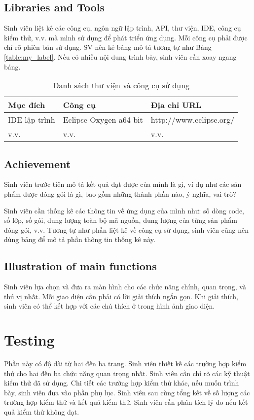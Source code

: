 \documentclass[../Main.tex]{subfiles}
\begin{document}
\subsection{Libraries and Tools}
Sinh viên liệt kê các công cụ, ngôn ngữ lập trình, API, thư viện, IDE, công cụ kiểm thử, v.v. mà mình sử dụng để phát triển ứng dụng. Mỗi công cụ phải được chỉ rõ phiên bản sử dụng. SV nên kẻ bảng mô tả tương tự như Bảng \ref{table:my_label}. Nếu có nhiều nội dung trình bày, sinh viên cần xoay ngang bảng.

\begin{table}[H]
\centering{}
    \begin{tabular}{lll}
        \hline
        \textbf{Mục đích} & \textbf{Công cụ}       & \textbf{Địa chỉ URL}    \\ \hline
        IDE lập trình     & Eclipse Oxygen a64 bit & http://www.eclipse.org/ \\ \hline
        v.v.              & v.v.                   & v.v.                    \\ \hline
        \end{tabular}
    \caption{Danh sách thư viện và công cụ sử dụng}
    \label{fig:my_label}
\end{table}

\subsection{Achievement}
Sinh viên trước tiên mô tả kết quả đạt được của mình là gì, ví dụ như các sản phẩm được đóng gói là gì, bao gồm những thành phần nào, ý nghĩa, vai trò?

Sinh viên cần thống kê các thông tin về ứng dụng của mình như: số dòng code, số lớp, số gói, dung lượng toàn bộ mã nguồn, dung lượng của từng sản phẩm đóng gói, v.v. Tương tự như phần liệt kê về công cụ sử dụng, sinh viên cũng nên dùng bảng để mô tả phần thông tin thống kê này.

\subsection{Illustration of main functions}
Sinh viên lựa chọn và đưa ra màn hình cho các chức năng chính, quan trọng, và thú vị nhất. Mỗi giao diện cần phải có lời giải thích ngắn gọn. Khi giải thích, sinh viên có thể kết hợp với các chú thích ở trong hình ảnh giao diện.

\section{Testing}
Phần này có độ dài từ hai đến ba trang. Sinh viên thiết kế các trường hợp kiểm thử cho hai đến ba chức năng quan trọng nhất. Sinh viên cần chỉ rõ các kỹ thuật kiểm thử đã sử dụng. Chi tiết các trường hợp kiểm thử khác, nếu muốn trình bày, sinh viên đưa vào phần phụ lục.
Sinh viên sau cùng tổng kết về số lượng các trường hợp kiểm thử và kết quả kiểm thử. Sinh viên cần phân tích lý do nếu kết quả kiểm thử không đạt.
\end{document}
